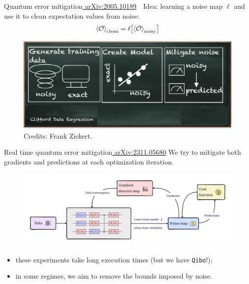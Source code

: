 \documentclass[8pt, xcolor={svgnames}, hyperref={linkcolor=black}]{beamer}
\begin{document}
\begin{frame}{Quantum error mitigation\hfill \href{https://arxiv.org/abs/2005.10189}{\faBook\,\,arXiv:2005.10189}}
\faLightbulbO\,\, Idea: learning a noise map $\ell$ and use it to clean expectation values from noise:
$$ \braket{\mathcal{O}}_{\rm clean} = \ell\bigl[ \braket{\mathcal{O}}_{\rm noisy} \bigr] $$
\pause 
\begin{figure}
    \includegraphics[width=1\textwidth]{figures/cdr.png}
    \caption*{Credits: Frank Zickert.}
\end{figure}
\end{frame}

\begin{frame}{Real time quantum error mitigation\hfill \href{https://arxiv.org/abs/2311.05680}{\faBook\,\,arXiv:2311.05680}}
\pause
We try to mitigate both gradients and predictions at each optimization iteration.
\pause
\begin{figure}
    \includegraphics[width=1\textwidth]{figures/rtqem.pdf}
\end{figure}
\pause
\begin{itemize}[noitemsep]
\item[\faClockO] these experiments take long execution times (but we have \texttt{Qibo}!);
\pause
\item[\faLeaf] in some regimes, we aim to remove the bounds imposed by noise.
\end{itemize}
\end{frame}
\end{document}
